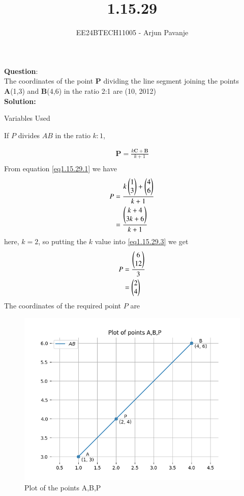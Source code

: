 \documentclass[journal]{IEEEtran}
\begin{document}

\vspace{3cm}

\title{1.15.29}
\author{EE24BTECH11005 - Arjun Pavanje
}
{\let\newpage\relax\maketitle}

\textbf{Question}:\\
The coordinates of the point \textbf{P} dividing the line segment joining the points \textbf{A}(1,3) and \textbf{B}(4,6) in the ratio 2:1 are
\hfill (10, 2012)
\\
\textbf{Solution: }
\begin{table}[h!]    
  \centering
  
  \caption{Variables Used}
  \label{tab1.15.29}
\end{table}
If $P$ divides $AB$ in the ratio $k:1$,


\begin{align} 
\textbf{P}=\frac{k\textbf{C}+\textbf{B}}{k+1} \label{eq1.15.29.1}\\
\end{align}
From equation \ref{eq1.15.29.1} we have
\begin{align}
P &= \frac{k
\begin{pmatrix}
1\\
3\end{pmatrix} +
\begin{pmatrix}
4\\
6\end{pmatrix}}{k+1} \label{eq1.15.29.2}\\
&= \frac{
\begin{pmatrix}
k+4 \\
3k+6
\end{pmatrix}}{k+1} \label{eq1.15.29.3}
\end{align}
here, $k = 2$, so putting the $k$ value into \ref{eq1.15.29.3} we get
\begin{align}
P &= \frac{
\begin{pmatrix}
6\\
12
\end{pmatrix}}{3} \label{eq1.15.29.4}\\
&=
\begin{pmatrix}
2\\
4
	\end{pmatrix} \label{eq1.15.29.5}
\end{align}
The coordinates of the required point $P$ are
\begin{figure}[h!]
   \centering
   \includegraphics[width=0.7\linewidth]{figs/Figure_1.png}
   \caption{Plot of the points A,B,P}
   \label{stemplot}
\end{figure}
\end{document}
